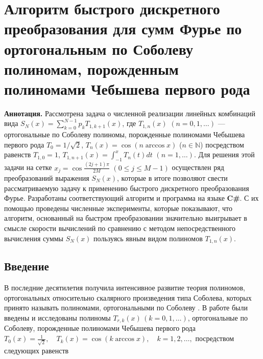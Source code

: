\section{Алгоритм быстрого дискретного преобразования для сумм Фурье по ортогональным по Соболеву полиномам, порожденным полиномами Чебышева первого рода}

\textbf{Аннотация.} Рассмотрена задача о численной реализации линейных комбинаций вида  $S_N(x) =\sum\nolimits_{k=0}^{N-1}p_kT_{1,k+1}(x)$, где
$T_{1,n}(x)$ $(n=0,1,\ldots)$ --- ортогональные по Соболеву полиномы, порожденные полиномами Чебышева первого рода $T_{0} = 1 / \sqrt{2}$, $T_{n}(x)=\cos( n\arccos x)$ ($n \in \mathbb{N}$) посредством
равенств $T_{1,0}=1$, $T_{1,n+1}(x) =\int_{-1}^x T_{n}(t)dt$ $(n=1,\ldots)$.
Для решения этой задачи на сетке $x_j=\cos\frac{(2j+1)\pi}{2M}$ $(0\le j\le M-1)$  осуществлен ряд преобразований выражения $S_N(x)$,
которые в итоге позволяют свести рассматриваемую задачу к применению быстрого дискретного преобразования Фурье.
Разработаны соответствующий алгоритм и программа на языке \textbf{C\#}.
С их помощью проведены численные эксперименты, которые показывают, что алгоритм, основанный на быстром преобразовании
значительно выигрывает в смысле скорости вычислений по сравнению с методом непосредственного вычисления суммы $S_N(x)$ пользуясь явным видом полиномов $T_{1,n}(x)$.

\subsection{Введение}

В последние десятилетия получила интенсивное развитие теория полиномов, ортогональных относительно скалярного произведения типа Соболева, которых принято называть полиномами, ортогональными  по Соболеву \cite{sms-stn-1-MarcelXu,sms-stn-1-SharIzVuz}. В работе \cite{sms-stn-1-SharIzVuz} были введены и исследованы полиномы $T_{r,k}(x)\,(k=0,1,\ldots)$, ортогональные по Соболеву, порожденные полиномами Чебышева первого рода
$T_0(x)=\frac{1}{\sqrt{2}},\quad T_k(x)=\cos(k\arccos x), \quad k=1,2,\ldots,$
посредством следующих равенств

